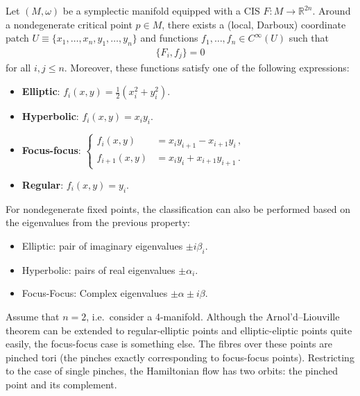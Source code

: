     \begin{property}
        Let $(M,\omega)$ be a symplectic manifold equipped with a CIS $F:M\rightarrow\mathbb{R}^{2n}$. Around a nondegenerate critical point $p\in M$, there exists a (local, Darboux) coordinate patch $U\equiv\{x_1,\ldots,x_n,y_1,\ldots,y_n\}$ and functions $f_1,\ldots,f_n\in C^\infty(U)$ such that
        \begin{gather}
            \{F_i,f_j\}=0
        \end{gather}
        for all $i,j\leq n$. Moreover, these functions satisfy one of the following expressions:
        \begin{itemize}
            \item\textbf{Elliptic}: $f_i(x,y)=\frac{1}{2}(x_i^2+y_i^2)$.
            \item\textbf{Hyperbolic}: $f_i(x,y) = x_iy_i$.
            \item\textbf{Focus-focus}: $\begin{cases}f_i(x,y)&=x_iy_{i+1}-x_{i+1}y_i\,,\\f_{i+1}(x,y)&=x_iy_i+x_{i+1}y_{i+1}\,.\end{cases}$
            \item\textbf{Regular}: $f_i(x,y)=y_i$.
        \end{itemize}
        For nondegenerate fixed points, the classification can also be performed based on the eigenvalues from the previous property:
        \begin{itemize}
            \item Elliptic: pair of imaginary eigenvalues $\pm i\beta_i$.
            \item Hyperbolic: pairs of real eigenvalues $\pm \alpha_i$.
            \item Focus-Focus: Complex eigenvalues $\pm\alpha\pm i\beta$.
        \end{itemize}
    \end{property}

    \begin{remark}
        Assume that $n=2$, i.e.~consider a 4-manifold. Although the Arnol'd--Liouville theorem can be extended to regular-elliptic points and elliptic-eliptic points quite easily, the focus-focus case is something else. The fibres over these points are pinched tori (the pinches exactly corresponding to focus-focus points). Restricting to the case of single pinches, the Hamiltonian flow has two orbits: the pinched point and its complement.
    \end{remark}

